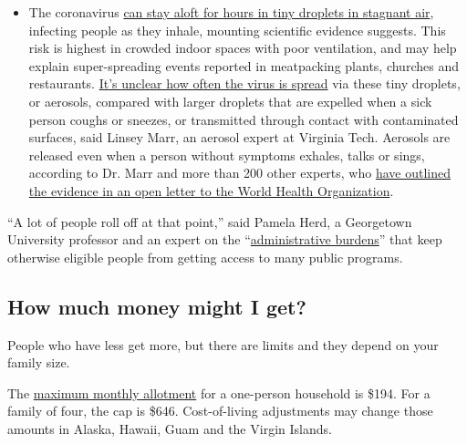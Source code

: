 \begin{itemize}
  \begin{itemize}
  \tightlist
  \item
    The coronavirus
    \href{https://www.nytimes3xbfgragh.onion/2020/07/04/health/239-experts-with-one-big-claim-the-coronavirus-is-airborne.html?action=click\&pgtype=Article\&state=default\&region=MAIN_CONTENT_3\&context=storylines_faq}{can
    stay aloft for hours in tiny droplets in stagnant air}, infecting
    people as they inhale, mounting scientific evidence suggests. This
    risk is highest in crowded indoor spaces with poor ventilation, and
    may help explain super-spreading events reported in meatpacking
    plants, churches and restaurants.
    \href{https://www.nytimes3xbfgragh.onion/2020/07/06/health/coronavirus-airborne-aerosols.html?action=click\&pgtype=Article\&state=default\&region=MAIN_CONTENT_3\&context=storylines_faq}{It's
    unclear how often the virus is spread} via these tiny droplets, or
    aerosols, compared with larger droplets that are expelled when a
    sick person coughs or sneezes, or transmitted through contact with
    contaminated surfaces, said Linsey Marr, an aerosol expert at
    Virginia Tech. Aerosols are released even when a person without
    symptoms exhales, talks or sings, according to Dr. Marr and more
    than 200 other experts, who
    \href{https://academic.oup.com/cid/article/doi/10.1093/cid/ciaa939/5867798}{have
    outlined the evidence in an open letter to the World Health
    Organization}.
  \end{itemize}
\end{itemize}

``A lot of people roll off at that point,'' said Pamela Herd, a
Georgetown University professor and an expert on the
``\href{https://www.russellsage.org/publications/administrative-burden}{administrative
burdens}'' that keep otherwise eligible people from getting access to
many public programs.

\hypertarget{how-much-money-might-i-get}{%
\subsection{How much money might I
get?}\label{how-much-money-might-i-get}}

People who have less get more, but there are limits and they depend on
your family size.

The \href{https://www.fns.usda.gov/snap/recipient/eligibility}{maximum
monthly allotment} for a one-person household is \$194. For a family of
four, the cap is \$646. Cost-of-living adjustments may change those
amounts in Alaska, Hawaii, Guam and the Virgin Islands.

